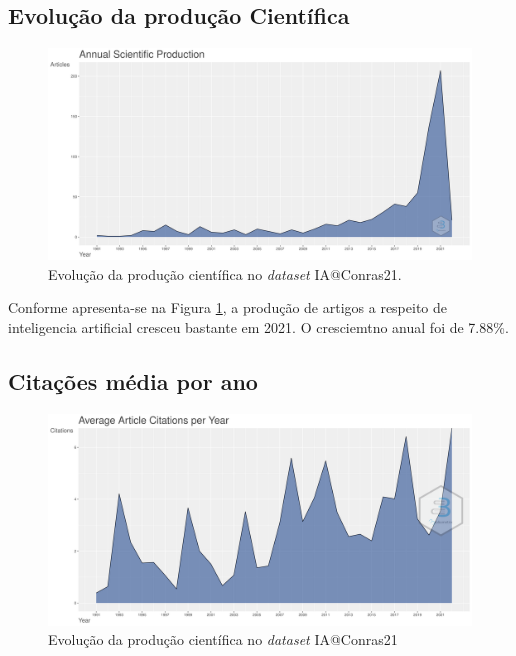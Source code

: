 \subsection{Evolução da produção Científica}

\begin{figure}[H]
    \centering
    \includegraphics[width=1\textwidth]{experiments/Conras21/PesqBib/AnnualScientificProduction-2022-02-08.png}
    \caption{Evolução da produção científica no \textit{dataset} IA@Conras21.}
    \label{fig:evol:anual:IA@Conras21}
\end{figure}

Conforme apresenta-se na Figura \ref{fig:evol:anual:IA@Conras21}, a produção de artigos a respeito de inteligencia artificial cresceu bastante em 2021. O cresciemtno anual foi de 7.88\%. 

\subsection{Citações média por ano}

\begin{figure}[H]
    \centering
    \includegraphics[width=1\textwidth]{experiments/Conras21/PesqBib/AverageArticleCitationPerYear-2022-02-08.png}
    \caption{Evolução da produção científica no \textit{dataset} IA@Conras21}
    \label{fig:citacoes:anual:IA@Conras21}
\end{figure}

